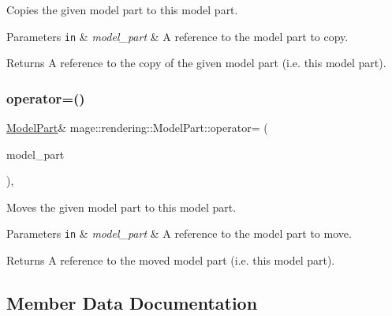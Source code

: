 Copies the given model part to this model part.


\begin{DoxyParams}[1]{Parameters}
\mbox{\tt in}  & {\em model\+\_\+part} & A reference to the model part to copy. \\
\hline
\end{DoxyParams}
\begin{DoxyReturn}{Returns}
A reference to the copy of the given model part (i.\+e. this model part). 
\end{DoxyReturn}
\mbox{\label{structmage_1_1rendering_1_1_model_part_a54950b40fa5dd12e77277669cbd6dc3a}} 
\subsubsection{\texorpdfstring{operator=()}{operator=()}\hspace{0.1cm}{\footnotesize\ttfamily [2/2]}}
{\footnotesize\ttfamily \mbox{\hyperlink{structmage_1_1rendering_1_1_model_part}{Model\+Part}}\& mage\+::rendering\+::\+Model\+Part\+::operator= (\begin{DoxyParamCaption}\item[{\mbox{\hyperlink{structmage_1_1rendering_1_1_model_part}{Model\+Part}} \&\&}]{model\+\_\+part }\end{DoxyParamCaption})\hspace{0.3cm}{\ttfamily [default]}, {\ttfamily [noexcept]}}

Moves the given model part to this model part.


\begin{DoxyParams}[1]{Parameters}
\mbox{\tt in}  & {\em model\+\_\+part} & A reference to the model part to move. \\
\hline
\end{DoxyParams}
\begin{DoxyReturn}{Returns}
A reference to the moved model part (i.\+e. this model part). 
\end{DoxyReturn}


\subsection{Member Data Documentation}
\mbox{\label{structmage_1_1rendering_1_1_model_part_a69f7f90a31e48a286fecebc9e680b5ef}} 
